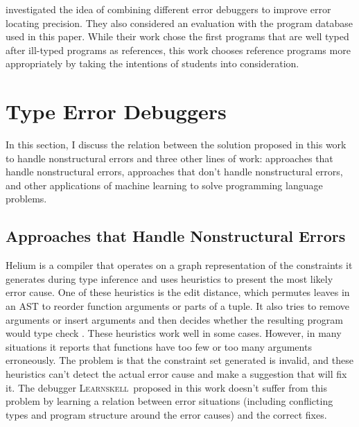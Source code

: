 \documentclass[12pt]{report}	%
\newcommand{\newCompiler}{\textsc{Learnskell}}
\begin{document}
\cite{chen2014let} investigated the idea
of combining different error debuggers to improve
error locating precision. They also considered
an evaluation with the program database used
in this paper. While their work
chose the first programs that are well typed after
ill-typed programs as references, this work chooses
reference programs more appropriately by taking the
intentions of students into consideration.

\section{Type Error Debuggers}
\label{sec:reivew:debugger}

In this section, I discuss the relation between the solution proposed in this work to handle nonstructural errors and
three other lines of work: approaches that handle nonstructural errors, approaches that don't handle nonstructural errors,
and other applications of machine learning to solve programming language problems.

\subsection{Approaches that Handle Nonstructural Errors}

Helium \cite{Hage07:HTE} is a compiler that operates
on a graph representation of the constraints it generates
during type inference
and uses heuristics to present the most likely error cause. One
of these heuristics is the edit distance, which permutes leaves in
an AST to reorder function arguments or parts of a
tuple. It also tries to remove arguments or insert arguments and
then decides whether the resulting program would type check \cite{Heeren03:HLH}.
These heuristics work well in some cases. However, in many situations it
reports that functions have too few or too many arguments erroneously.
%
The problem is that the constraint
set generated is invalid, and these heuristics can't detect
the actual error cause and make a suggestion that will fix it.
%
The debugger \newCompiler\ proposed in this work doesn't suffer from this problem by learning
a relation between error situations (including conflicting types
and program structure around the error causes) and the correct fixes.
\end{document}
